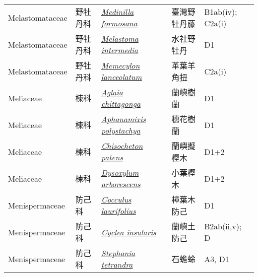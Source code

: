 {\begin{longtable}{p{2.5cm}p{2.5cm}p{4.5cm}p{2.5cm}p{3cm}}
    Melastomataceae & 野牡丹科 & \href{http://www.theplantlist.org/tpl1.1/search?q=Medinilla+formosana}{\textit{Medinilla formosana} } & 臺灣野牡丹藤 & B1ab(iv); C2a(i) \index{Medinilla@\textit{Medinilla}!formosana@\textit{formosana}}  \index{臺灣野牡丹藤} \\
    Melastomataceae & 野牡丹科 & \href{http://www.theplantlist.org/tpl1.1/search?q=Melastoma+intermedia}{\textit{Melastoma intermedia} } & 水社野牡丹 & D1 \index{Melastoma@\textit{Melastoma}!intermedia@\textit{intermedia}}  \index{水社野牡丹} \\
    Melastomataceae & 野牡丹科 & \href{http://www.theplantlist.org/tpl1.1/search?q=Memecylon+lanceolatum}{\textit{Memecylon lanceolatum} } & 革葉羊角扭 & C2a(i) \index{Memecylon@\textit{Memecylon}!lanceolatum@\textit{lanceolatum}}  \index{革葉羊角扭} \\
    Meliaceae & 楝科 & \href{http://www.theplantlist.org/tpl1.1/search?q=Aglaia+chittagonga}{\textit{Aglaia chittagonga} } & 蘭嶼樹蘭 & D1 \index{Aglaia@\textit{Aglaia}!chittagonga@\textit{chittagonga}}  \index{蘭嶼樹蘭} \\
    Meliaceae & 楝科 & \href{http://www.theplantlist.org/tpl1.1/search?q=Aphanamixis+polystachya}{\textit{Aphanamixis polystachya} } & 穗花樹蘭 & D1 \index{Aphanamixis@\textit{Aphanamixis}!polystachya@\textit{polystachya}}  \index{穗花樹蘭} \\
    Meliaceae & 楝科 & \href{http://www.theplantlist.org/tpl1.1/search?q=Chisocheton+patens}{\textit{Chisocheton patens} } & 蘭嶼擬樫木 & D1+2 \index{Chisocheton@\textit{Chisocheton}!patens@\textit{patens}}  \index{蘭嶼擬樫木} \\
    Meliaceae & 楝科 & \href{http://www.theplantlist.org/tpl1.1/search?q=Dysoxylum+arborescens}{\textit{Dysoxylum arborescens} } & 小葉樫木 & D1+2 \index{Dysoxylum@\textit{Dysoxylum}!arborescens@\textit{arborescens}}  \index{小葉樫木} \\
    Menispermaceae & 防己科 & \href{http://www.theplantlist.org/tpl1.1/search?q=Cocculus+laurifolius}{\textit{Cocculus laurifolius} } & 樟葉木防己 & D1 \index{Cocculus@\textit{Cocculus}!laurifolius@\textit{laurifolius}}  \index{樟葉木防己} \\
    Menispermaceae & 防己科 & \href{http://www.theplantlist.org/tpl1.1/search?q=Cyclea+insularis}{\textit{Cyclea insularis} } & 蘭嶼土防己 & B2ab(ii,v); D \index{Cyclea@\textit{Cyclea}!insularis@\textit{insularis}}  \index{蘭嶼土防己} \\
    Menispermaceae & 防己科 & \href{http://www.theplantlist.org/tpl1.1/search?q=Stephania+tetrandra}{\textit{Stephania tetrandra} } & 石蟾蜍 & A3, D1 \index{Stephania@\textit{Stephania}!tetrandra@\textit{tetrandra}}  \index{石蟾蜍} \\

\end{longtable}}

